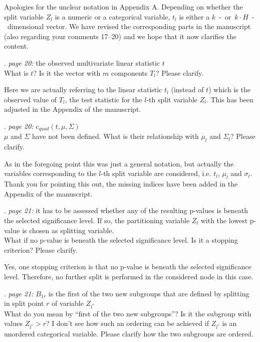 \documentclass[american,foldmarks=false,noconfig]{uibklttr}
\newenvironment{review}{\fontshape{\itdefault}\fontseries{\bfdefault} \selectfont \smallskip}{\par}
\begin{document}
Apologies for the unclear notation in Appendix A.
Depending on whether the split variable $Z_l$ is a numeric 
or a categorical variable, $t_l$ is either a
$k$~-~or~$k \cdot H$~-~dimensional vector.
We have revised the corresponding parts in the manuscript (also 
regarding your comments 17--20) and we hope that it now clarifies 
the content.


\begin{review}
17. {\color{quotecolor}\textit{page 20:} the observed 
multivariate linear statistic $t$}\\
What is $t$? Is it the vector with $m$ components $T_l$? 
Please clarify.
\end{review}

Here we are actually referring to the linear statistic $t_l$ (instead of $t$) 
which is the observed value of $T_l$, the test statistic for the $l$-th split 
variable $Z_l$. This has been adjusted in the Appendix of the manuscript.

\begin{review}
18. {\color{quotecolor}\textit{page 20:} $c_{quad}(t, \mu, \Sigma)$}\\
$\mu$ and $\Sigma$ have not been defined. What is their relationship 
with $\mu_l$ and $\Sigma_l$? Please clarify.
\end{review}

As in the foregoing point this was just a general notation, but 
actually the variables corresponding to the $l$-th split variable 
are considered, i.e. $t_l$, $\mu_l$ and $\sigma_l$. Thank you for
pointing this out, the missing indices have been added in the
Appendix of the manuscript.

\begin{review}
19. {\color{quotecolor}\textit{page 21:} it has to be assessed 
whether any of the resulting p-values is beneath the selected 
significance level. If so, the partitioning variable $Z_l$
with the lowest p-value is chosen as splitting variable.}\\
What if no p-value is beneath the selected significance level. 
Is it a stopping criterion? Please clarify.
\end{review}

Yes, one stopping criterion is that no p-value is beneath the 
selected significance level. Therefore, no further 
split is performed in the considered node in this case.

\begin{review}
20. {\color{quotecolor}\textit{page 21:} $B_{1r}$ is the first 
of the two new subgroups that are defined by splitting in split 
point $r$ of variable $Z_{l^{\ast}}$}\\
What do you mean by ``first of the two new subgroups''? Is it 
the subgroup with values $Z_{l^{\ast}} > r$? I don't see how 
such an ordering can be achieved if $Z_{l^{\ast}}$ is an 
unordered categorical variable. Please clarify how the two
subgroups are ordered.
\end{review}
\end{document}
